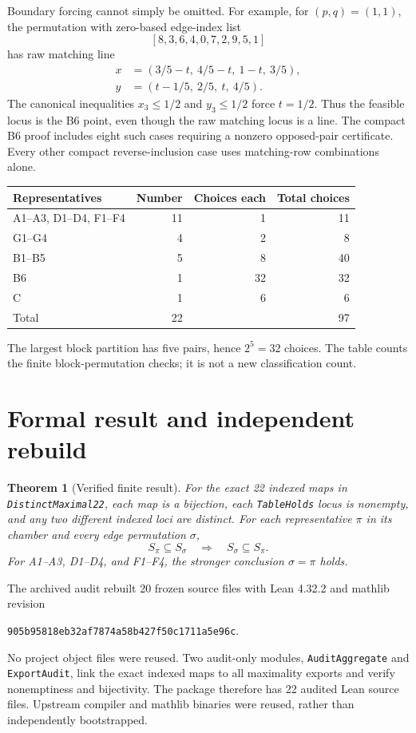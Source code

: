\documentclass[11pt]{article}
\newtheorem{theorem}{Theorem}
\begin{document}
Boundary forcing cannot simply be omitted. For example, for $(p,q)=(1,1)$, the permutation with zero-based edge-index list
\[
 [8,3,6,4,0,7,2,9,5,1]
\]
has raw matching line
\begin{align*}
 x&=(3/5-t,\ 4/5-t,\ 1-t,\ 3/5),\\
 y&=(t-1/5,\ 2/5,\ t,\ 4/5).
\end{align*}
The canonical inequalities $x_3\leq1/2$ and $y_3\leq1/2$ force $t=1/2$. Thus the feasible locus is the B6 point, even though the raw matching locus is a line. The compact B6 proof includes eight such cases requiring a nonzero opposed-pair certificate. Every other compact reverse-inclusion case uses matching-row combinations alone.

\begin{center}
\begin{tabular}{lrrr}
\toprule
Representatives & Number & Choices each & Total choices\\
\midrule
A1--A3, D1--D4, F1--F4 & 11 & 1 & 11\\
G1--G4 & 4 & 2 & 8\\
B1--B5 & 5 & 8 & 40\\
B6 & 1 & 32 & 32\\
C & 1 & 6 & 6\\
\midrule
Total & 22 & & 97\\
\bottomrule
\end{tabular}
\end{center}
The largest block partition has five pairs, hence $2^5=32$ choices. The table counts the finite block-permutation checks; it is not a new classification count.

\section{Formal result and independent rebuild}
\begin{theorem}[Verified finite result]
For the exact 22 indexed maps in \texttt{DistinctMaximal22}, each map is a bijection, each \texttt{TableHolds} locus is nonempty, and any two different indexed loci are distinct. For each representative $\pi$ in its chamber and every edge permutation $\sigma$,
\[
 S_\pi\subseteq S_\sigma\quad\Longrightarrow\quad S_\sigma\subseteq S_\pi.
\]
For A1--A3, D1--D4, and F1--F4, the stronger conclusion $\sigma=\pi$ holds.
\end{theorem}

The archived audit rebuilt 20 frozen source files with Lean 4.32.2 and mathlib revision
\begin{center}\small\texttt{905b95818eb32af7874a58b427f50c1711a5e96c}.\end{center}
No project object files were reused. Two audit-only modules, \texttt{AuditAggregate} and \texttt{ExportAudit}, link the exact indexed maps to all maximality exports and verify nonemptiness and bijectivity. The package therefore has 22 audited Lean source files. Upstream compiler and mathlib binaries were reused, rather than independently bootstrapped.
\end{document}
